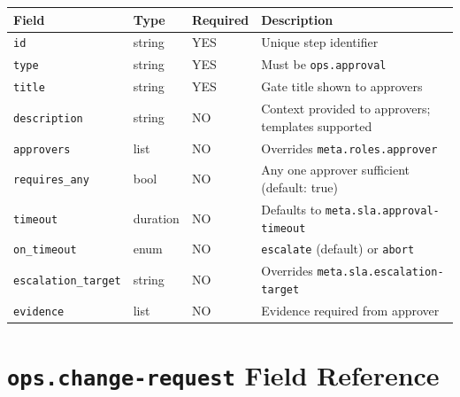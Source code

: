 \begin{center}
\small
\begin{tabular}{lllp{5cm}}
\textbf{Field} & \textbf{Type} & \textbf{Required} & \textbf{Description} \\
\hline
\texttt{id} & string & YES & Unique step identifier \\
\texttt{type} & string & YES & Must be \texttt{ops.approval} \\
\texttt{title} & string & YES & Gate title shown to approvers \\
\texttt{description} & string & NO & Context provided to approvers; templates supported \\
\texttt{approvers} & list & NO & Overrides \texttt{meta.roles.approver} \\
\texttt{requires\_any} & bool & NO & Any one approver sufficient (default: true) \\
\texttt{timeout} & duration & NO & Defaults to \texttt{meta.sla.approval-timeout} \\
\texttt{on\_timeout} & enum & NO & \texttt{escalate} (default) or \texttt{abort} \\
\texttt{escalation\_target} & string & NO & Overrides \texttt{meta.sla.escalation-target} \\
\texttt{evidence} & list & NO & Evidence required from approver \\
\end{tabular}
\end{center}

\section{\texttt{ops.change-request} Field Reference}
\label{sec:ref-ops-cr}

